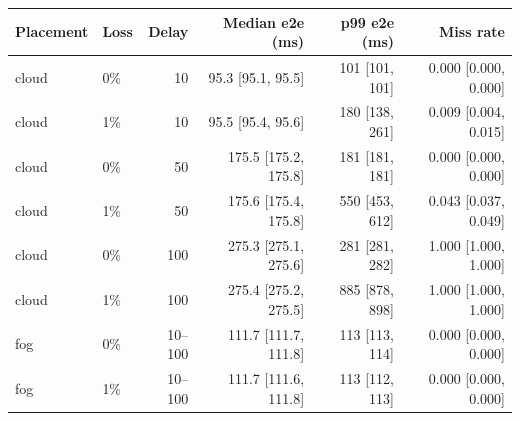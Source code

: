 \begin{tabular}{@{}llrrrr@{}}
\toprule
Placement & Loss & Delay & Median e2e (ms) & p99 e2e (ms) & Miss rate \\
\midrule
cloud & 0\% & 10 & 95.3 [95.1, 95.5] & 101 [101, 101] & 0.000 [0.000, 0.000] \\
cloud & 1\% & 10 & 95.5 [95.4, 95.6] & 180 [138, 261] & 0.009 [0.004, 0.015] \\
cloud & 0\% & 50 & 175.5 [175.2, 175.8] & 181 [181, 181] & 0.000 [0.000, 0.000] \\
cloud & 1\% & 50 & 175.6 [175.4, 175.8] & 550 [453, 612] & 0.043 [0.037, 0.049] \\
cloud & 0\% & 100 & 275.3 [275.1, 275.6] & 281 [281, 282] & 1.000 [1.000, 1.000] \\
cloud & 1\% & 100 & 275.4 [275.2, 275.5] & 885 [878, 898] & 1.000 [1.000, 1.000] \\
fog & 0\% & 10--100 & 111.7 [111.7, 111.8] & 113 [113, 114] & 0.000 [0.000, 0.000] \\
fog & 1\% & 10--100 & 111.7 [111.6, 111.8] & 113 [112, 113] & 0.000 [0.000, 0.000] \\
\bottomrule
\end{tabular}
